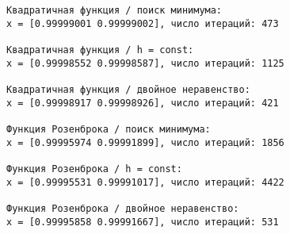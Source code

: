 \documentclass[11pt]{article}
\begin{document}
    \begin{Verbatim}[commandchars=\\\{\}]
Квадратичная функция / поиск минимума:
x = [0.99999001 0.99999002], число итераций: 473

Квадратичная функция / h = const:
x = [0.99998552 0.99998587], число итераций: 1125

Квадратичная функция / двойное неравенство:
x = [0.99998917 0.99998926], число итераций: 421

Функция Розенброка / поиск минимума:
x = [0.99995974 0.99991899], число итераций: 1856

Функция Розенброка / h = const:
x = [0.99995531 0.99991017], число итераций: 4422

Функция Розенброка / двойное неравенство:
x = [0.99995858 0.99991667], число итераций: 531

    \end{Verbatim}
\end{document}
